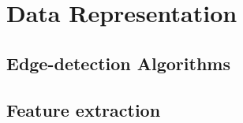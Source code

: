

\chapter{Data Representation}


\section{Edge-detection Algorithms}


\section{Feature extraction}






